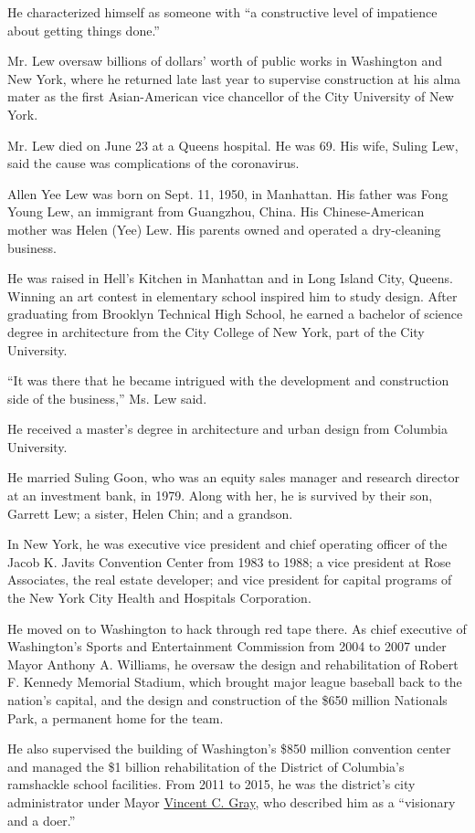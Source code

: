 He characterized himself as someone with ``a constructive level of
impatience about getting things done.''

Mr. Lew oversaw billions of dollars' worth of public works in Washington
and New York, where he returned late last year to supervise construction
at his alma mater as the first Asian-American vice chancellor of the
City University of New York.

Mr. Lew died on June 23 at a Queens hospital. He was 69. His wife,
Suling Lew, said the cause was complications of the coronavirus.

Allen Yee Lew was born on Sept. 11, 1950, in Manhattan. His father was
Fong Young Lew, an immigrant from Guangzhou, China. His Chinese-American
mother was Helen (Yee) Lew. His parents owned and operated a
dry-cleaning business.

He was raised in Hell's Kitchen in Manhattan and in Long Island City,
Queens. Winning an art contest in elementary school inspired him to
study design. After graduating from Brooklyn Technical High School, he
earned a bachelor of science degree in architecture from the City
College of New York, part of the City University.

``It was there that he became intrigued with the development and
construction side of the business,'' Ms. Lew said.

He received a master's degree in architecture and urban design from
Columbia University.

He married Suling Goon, who was an equity sales manager and research
director at an investment bank, in 1979. Along with her, he is survived
by their son, Garrett Lew; a sister, Helen Chin; and a grandson.

In New York, he was executive vice president and chief operating officer
of the Jacob K. Javits Convention Center from 1983 to 1988; a vice
president at Rose Associates, the real estate developer; and vice
president for capital programs of the New York City Health and Hospitals
Corporation.

He moved on to Washington to hack through red tape there. As chief
executive of Washington's Sports and Entertainment Commission from 2004
to 2007 under Mayor Anthony A. Williams, he oversaw the design and
rehabilitation of Robert F. Kennedy Memorial Stadium, which brought
major league baseball back to the nation's capital, and the design and
construction of the \$650 million Nationals Park, a permanent home for
the team.

He also supervised the building of Washington's \$850 million convention
center and managed the \$1 billion rehabilitation of the District of
Columbia's ramshackle school facilities. From 2011 to 2015, he was the
district's city administrator under Mayor
\href{https://www.nytimes.com/2014/04/02/us/muriel-bowser-defeats-mayor-vincent-gray-in-washington-primary.html}{Vincent
C. Gray}, who described him as a ``visionary and a doer.''


